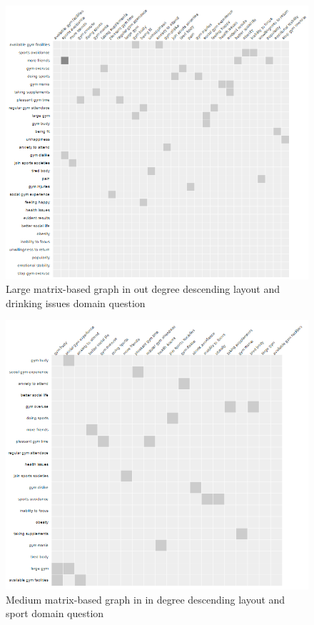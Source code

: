 \documentclass{l4proj}
\begin{document}
\begin{appendices}
\begin{figure}[H]
\centering
\includegraphics[width=16cm]{images/gymLargeOutDD.PNG}
\caption{Large matrix-based graph in out degree descending layout and drinking issues domain question}
\label{gymLargeOutDD}
\end{figure}

\begin{figure}[H]
\centering
\includegraphics[width=16cm]{images/gymMedInDD.PNG}
\caption{Medium matrix-based graph in in degree descending layout and sport domain question}
\label{gymMedInDD}
\end{figure}


\end{appendices}
\end{document}
